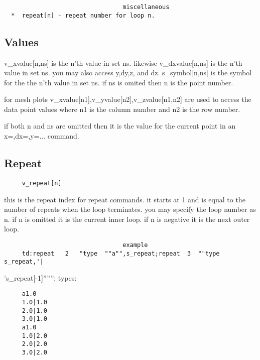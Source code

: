 \begin{verbatim}
                                 miscellaneous
  *  repeat[n] - repeat number for loop n.  
\end{verbatim}

\subsection{Values}
v\_xvalue[n,ns]  is the n'th value in set ns.  likewise v\_dxvalue[n,ns] is
the n'th  value  in  set  ns.   you  may  also  access  y,dy,z,  and  dz.
s\_symbol[n,ns]  is the symbol for the the n'th value in set ns.  if ns is
omited then n is the point number.  

for  mesh  plots  v\_xvalue[n1],v\_yvalue[n2],v\_zvalue[n1,n2]  are  used to
access the data point values where n1 is the column number and n2 is  the
row number.  

if  both  n and ns are omitted then it is the value for the current point
in an x=,dx=,y=...  command.  
\subsection{Repeat}
\begin{verbatim}
     v_repeat[n] 
\end{verbatim}
this  is  the  repeat  index  for repeat commands.  it starts at 1 and is
equal to the number of repeats when the loop terminates.  you may specify
the  loop number as n.  if n is omitted it is the current inner loop.  if
n is negative it is the next outer loop.  

\begin{verbatim}
                                 example
     td:repeat   2   "type  ""a"",s_repeat;repeat  3  ""type  s_repeat,'|
\end{verbatim}
's\_repeat[-1]'''''';  
types:  
\begin{verbatim}
     a1.0 
     1.0|1.0 
     2.0|1.0 
     3.0|1.0 
     a1.0 
     1.0|2.0 
     2.0|2.0 
     3.0|2.0 
\end{verbatim}
